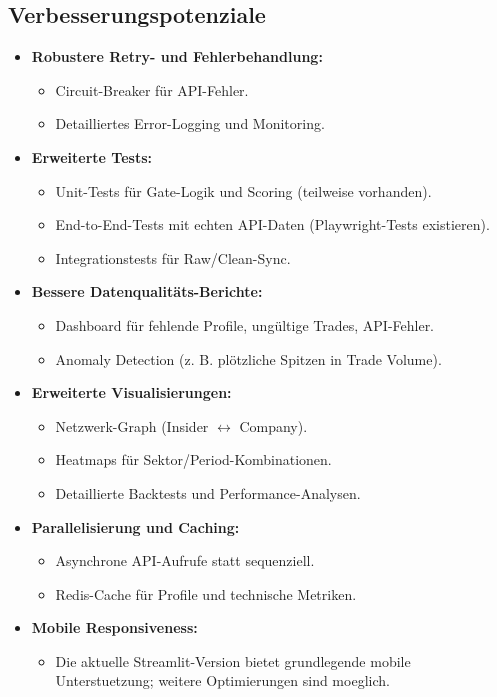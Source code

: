 \subsection{Verbesserungspotenziale}
\begin{itemize}
  \item \textbf{Robustere Retry- und Fehlerbehandlung:}
    \begin{itemize}
      \item Circuit-Breaker für API-Fehler.
      \item Detailliertes Error-Logging und Monitoring.
    \end{itemize}
  \item \textbf{Erweiterte Tests:}
    \begin{itemize}
      \item Unit-Tests für Gate-Logik und Scoring (teilweise vorhanden).
      \item End-to-End-Tests mit echten API-Daten (Playwright-Tests existieren). %
      \item Integrationstests für Raw/Clean-Sync.
    \end{itemize}
  \item \textbf{Bessere Datenqualitäts-Berichte:}
    \begin{itemize}
      \item Dashboard für fehlende Profile, ungültige Trades, API-Fehler.
      \item Anomaly Detection (z. B. plötzliche Spitzen in Trade Volume).
    \end{itemize}
  \item \textbf{Erweiterte Visualisierungen:}
    \begin{itemize}
      \item Netzwerk-Graph (Insider $\leftrightarrow$ Company).
      \item Heatmaps für Sektor/Period-Kombinationen.
      \item Detaillierte Backtests und Performance-Analysen.
    \end{itemize}
  \item \textbf{Parallelisierung und Caching:}
    \begin{itemize}
      \item Asynchrone API-Aufrufe statt sequenziell.
      \item Redis-Cache für Profile und technische Metriken.
    \end{itemize}
  \item \textbf{Mobile Responsiveness:}
    \begin{itemize}
      \item Die aktuelle Streamlit-Version bietet grundlegende mobile Unterstuetzung; weitere Optimierungen sind moeglich. %
    \end{itemize}
\end{itemize}

